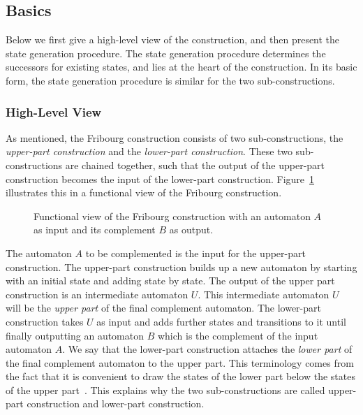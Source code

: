 \subsection{Basics}
\label{3_basics}
Below we first give a high-level view of the construction, and then present the state generation procedure. The state generation procedure determines the successors for existing states, and lies at the heart of the construction. In its basic form, the state generation procedure is similar for the two sub-constructions.

\subsubsection{High-Level View}
As mentioned, the Fribourg construction consists of two sub-constructions, the \textit{upper-part construction} and the \textit{lower-part construction}. These two sub-constructions are chained together, such that the output of the upper-part construction becomes the input of the lower-part construction. Figure~\ref{fribourg_construction} illustrates this in a functional view of the Fribourg construction.

\begin{figure}[htb]
\centering
\FribourgConstruction
\caption{Functional view of the Fribourg construction with an automaton $A$ as input and its complement $B$ as output.}
\label{fribourg_construction}
\end{figure}

The automaton $A$ to be complemented is the input for the upper-part construction. The upper-part construction builds up a new automaton by starting with an initial state and adding state by state. The output of the upper part construction is an intermediate automaton $U$. This intermediate automaton $U$ will be the \textit{upper part} of the final complement automaton. The lower-part construction takes $U$ as input and adds further states and transitions to it until finally outputting an automaton $B$ which is the complement of the input automaton $A$. We say that the lower-part construction attaches the \textit{lower part} of the final complement automaton to the upper part. This terminology comes from the fact that it is convenient to draw the states of the lower part below the states of the upper part~\cite{2014_joel_ulrich}. This explains why the two sub-constructions are called upper-part construction and lower-part construction.



